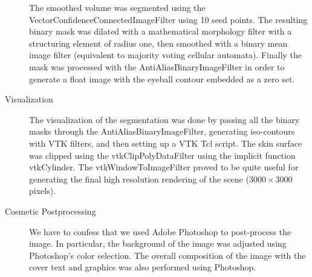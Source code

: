 \begin{description}
The smoothed volume was segmented using the
VectorConfidenceConnectedImageFilter using 10 seed points. The resulting
binary mask was dilated with a mathematical morphology filter with a
structuring element of radius one, then smoothed with a binary mean image
filter (equivalent to majority voting cellular automata). Finally the mask
was processed with the AntiAliasBinaryImageFilter in order to generate a
float image with the eyeball contour embedded as a zero set.

\item[Visualization]
The visualization of the segmentation was done by passing all the binary
masks through the AntiAliasBinaryImageFilter, generating iso-contours with
VTK filters, and then setting up a VTK Tcl script. The skin surface was
clipped using the vtkClipPolyDataFilter using the implicit function
vtkCylinder. The vtkWindowToImageFilter proved to be quite useful for
generating the final high resolution rendering of the scene ($3000\times3000$
pixels).

\item[Cosmetic Postprocessing]
We have to confess that we used Adobe Photoshop to post-process the image. In
particular, the background of the image was adjusted using Photoshop's color
selection. The overall composition of the image with the cover text and
graphics was also performed using Photoshop.

\end{description}

\normalsize
